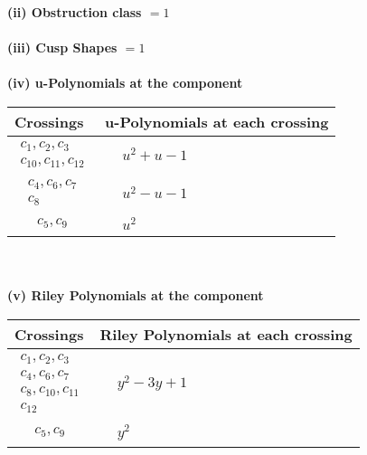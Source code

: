 \documentclass[1p]{elsarticle_modified}
\theoremstyle{definition}
\begin{document}
\flushleft \textbf{(ii) Obstruction class $= 1$}\\~\\
\flushleft \textbf{(iii) Cusp Shapes $= 1$}\\~\\
\newpage\renewcommand{\arraystretch}{1}
\flushleft \textbf{(iv) u-Polynomials at the component}\newline \\
\begin{tabular}{m{50pt}|m{274pt}}
Crossings & \hspace{64pt}u-Polynomials at each crossing \\
\hline $$\begin{aligned}c_{1},c_{2},c_{3}\\c_{10},c_{11},c_{12}\end{aligned}$$&$\begin{aligned}
&u^2+u-1
\end{aligned}$\\
\hline $$\begin{aligned}c_{4},c_{6},c_{7}\\c_{8}\end{aligned}$$&$\begin{aligned}
&u^2- u-1
\end{aligned}$\\
\hline $$\begin{aligned}c_{5},c_{9}\end{aligned}$$&$\begin{aligned}
&u^2
\end{aligned}$\\
\hline
\end{tabular}\\~\\
\newpage\renewcommand{\arraystretch}{1}
\flushleft \textbf{(v) Riley Polynomials at the component}\newline \\
\begin{tabular}{m{50pt}|m{274pt}}
Crossings & \hspace{64pt}Riley Polynomials at each crossing \\
\hline $$\begin{aligned}c_{1},c_{2},c_{3}\\c_{4},c_{6},c_{7}\\c_{8},c_{10},c_{11}\\c_{12}\end{aligned}$$&$\begin{aligned}
&y^2-3 y+1
\end{aligned}$\\
\hline $$\begin{aligned}c_{5},c_{9}\end{aligned}$$&$\begin{aligned}
&y^2
\end{aligned}$\\
\hline
\end{tabular}\\~\\
\end{document}
